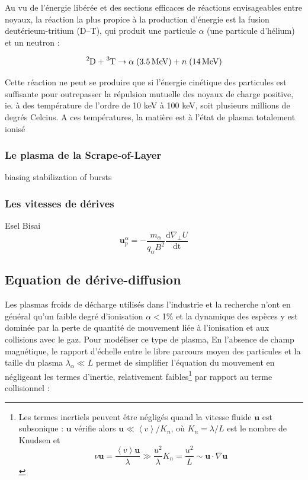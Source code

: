 \begin{refsection}
Au vu de l'énergie libérée et des sections efficaces de réactions envisageables
entre noyaux, la réaction la plus propice à la production d'énergie est la
fusion deutérieum-tritium (D--T), qui produit une particule $\alpha$ (une
particule d'hélium) et un neutron :

\begin{equation}
\ce{^2\text{D}}+\ce{^3\text{T}} \rightarrow
\alpha\;(3.5\,\text{MeV})+n\;(14\,\text{MeV})
\end{equation}



Cette réaction ne peut se produire que si l'énergie cinétique des particules est
suffisante pour outrepasser la répulsion mutuelle des noyaux de charge positive,
ie. à des température de l'ordre de 10 keV à 100 keV, soit plusieurs millions de
degrés Celcius. A ces températures, la matière est à l'état de plasma totalement
ionisé

\parencite{Wesson}
\subsubsection{Le plasma de la Scrape-of-Layer}
\parencite{Ghendrih}biasing stabilization of bursts
\subsubsection{Les vitesses de dérives}
\parencite{Garcia}Esel
\parencite{Bisai}Bisai
\label{vitessesDerive}
\begin{equation}
\label{1-vitessePol}
\mathbf{u}_p^\alpha=-\frac{m_\alpha}{q_\alpha B^2}\frac{\text{d}\nabla_\perp
U}{\text{dt}}
\end{equation}

\subsection{Equation de dérive-diffusion}
\label{1-transportAmbipolaire}
Les plasmas froids de décharge utilisés dans l'industrie et la recherche n'ont
en général qu'un faible degré d'ionisation $\alpha<$1\% et la dynamique des
espèces y est dominée par la perte de quantité de mouvement liée à l'ionisation
et aux collisions avec le gaz. Pour modéliser ce type de plasma, En l'absence de champ magnétique, le
rapport d'échelle entre le libre parcours moyen des particules et la taille du
plasma $\lambda_\alpha\ll L$ permet de simplifier l'équation du mouvement en
négligeant les termes d'inertie, relativement faibles\footnote{Les termes
inertiels peuvent être négligés quand la vitesse fluide $\mathbf u$ est
subsonique : $\mathbf u$ vérifie alors $\mathbf u\ll \left<v\right>/K_n$, où
$K_n=\lambda/L$ est le nombre de Knudsen et $$\nu \mathbf u=\frac{
\left<v\right>\mathbf u}{\lambda}\gg \frac{u^2}{\lambda}K_n=\frac{u^2}{L}\sim
\mathbf u\cdot\nabla\mathbf u$$} par rapport au terme collisionnel :


\end{refsection}
